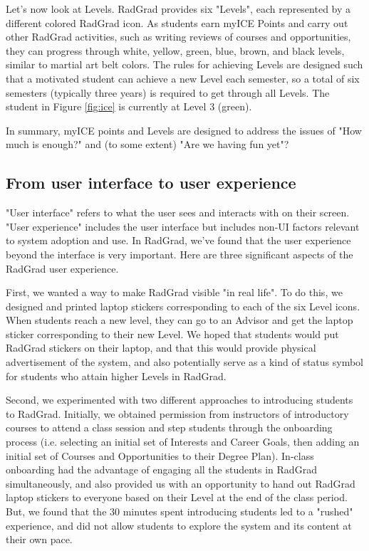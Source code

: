 \documentclass[acmsmall]{acmart}
\begin{document}
Let's now look at Levels.  RadGrad provides six "Levels", each represented by a different colored RadGrad icon. As students earn myICE Points and carry out other RadGrad activities, such as writing reviews of courses and opportunities, they can progress through white, yellow, green, blue, brown, and black levels, similar to martial art belt colors. The rules for achieving Levels are designed such that a motivated student can achieve a new Level each semester, so a total of six semesters (typically three years) is required to get through all Levels.  The student in Figure \ref{fig:ice} is currently at Level 3 (green).

In summary, myICE points and Levels are designed to address the issues of "How much is enough?" and (to some extent) "Are we having fun yet"?

\subsection{From user interface to user experience}

"User interface" refers to what the user sees and interacts with on their screen. "User experience" includes the user interface but includes non-UI factors relevant to system adoption and use.  In RadGrad, we've found that the user experience beyond the interface is very important. Here are three significant aspects of the RadGrad user experience.

First, we wanted a way to make RadGrad visible "in real life".  To do this, we designed and printed laptop stickers corresponding to each of the six Level icons. When students reach a new level, they can go to an Advisor and get the laptop sticker corresponding to their new Level. We hoped that students would put RadGrad stickers on their laptop, and that this would provide physical advertisement of the system, and also potentially serve as a kind of status symbol for students who attain higher Levels in RadGrad.

Second, we experimented with two different approaches to introducing students to RadGrad. Initially, we obtained permission from instructors of introductory courses to attend a class session and step students through the onboarding process (i.e. selecting an initial set of Interests and Career Goals, then adding an initial set of Courses and Opportunities to their Degree Plan).  In-class onboarding had the advantage of engaging all the students in RadGrad simultaneously, and also provided us with an opportunity to hand out RadGrad laptop stickers to everyone based on their Level at the end of the class period.  But, we found that the 30 minutes spent introducing students led to a "rushed" experience, and did not allow students to explore the system and its content at their own pace.
\end{document}
